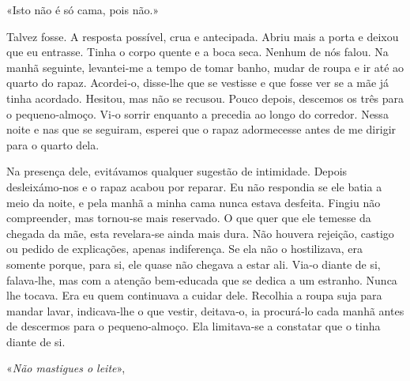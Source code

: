 «Isto não é só cama, pois não.»

Talvez fosse. A resposta possível, crua e antecipada. Abriu mais a porta
e deixou que eu entrasse. Tinha o corpo quente e a boca seca. Nenhum de
nós falou. Na manhã seguinte, levantei­‑me a tempo de tomar banho, mudar
de roupa e ir até ao quarto do rapaz. Acordei­‑o, disse­‑lhe que se
vestisse e que fosse ver se a mãe já tinha acordado. Hesitou, mas não se
recusou. Pouco depois, descemos os três para o pequeno­‑almoço. Vi­‑o
sorrir enquanto a precedia ao longo do corredor. Nessa noite e nas que
se seguiram, esperei que o rapaz adormecesse antes de me dirigir para o
quarto dela.

Na presença dele, evitávamos qualquer sugestão de intimidade. Depois
desleixámo­‑nos e o rapaz acabou por reparar. Eu não respondia se ele
batia a meio da noite, e pela manhã a minha cama nunca estava desfeita.
Fingiu não compreender, mas tornou­‑se mais reservado. O que quer que
ele temesse da chegada da mãe, esta revelara­‑se ainda mais dura. Não
houvera rejeição, castigo ou pedido de explicações, apenas indiferença.
Se ela não o hostilizava, era somente porque, para si, ele quase não
chegava a estar ali. Via­‑o diante de si, falava­‑lhe, mas com a atenção
bem­‑educada que se dedica a um estranho. Nunca lhe tocava. Era eu quem
continuava a cuidar dele. Recolhia a roupa suja para mandar lavar,
indicava­‑lhe o que vestir, deitava­‑o, ia procurá­‑lo cada manhã antes
de descermos para o pequeno­‑almoço. Ela limitava­‑se a constatar que o
tinha diante de si.

«\emph{Não mastigues o leite}»,

